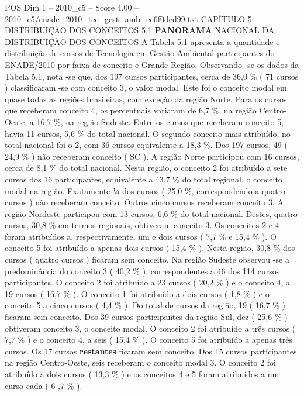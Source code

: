 \begin{textsample}{POS Dim 1 – 2010\_c5 – Score 4.00 – 2010\_c5/enade\_2010\_tec\_gest\_amb\_ee6f0ded99.txt}  \label{ex:f1_pos_138}
CAPÍTULO 5 DISTRIBUIÇÃO DOS CONCEITOS 5.1 \textbf{PANORAMA} NACIONAL DA DISTRIBUIÇÃO DOS CONCEITOS A Tabela 5.1 apresenta a quantidade e distribuição de cursos de Tecnologia em Gestão Ambiental participantes do ENADE/2010 por faixa de conceito e Grande Região.
Observando -se os dados da Tabela 5.1, nota -se que, dos 197 cursos participantes, cerca de 36,0 \% ( 71 cursos ) classificaram -se com conceito 3, o valor modal.
Este foi o conceito modal em quase todas as regiões brasileiras, com exceção da região Norte.
Para os cursos que receberam conceito 4, os percentuais variaram de 6,7 \%, na região Centro-Oeste, a 16,7 \%, na região Sudeste.
Entre os cursos que receberam conceito 5, havia 11 cursos, 5,6 \% do total nacional.
O segundo conceito mais atribuído, no total nacional foi o 2, com 36 cursos equivalente a 18,3 \%.
Dos 197 cursos, 49 ( 24,9 \% ) não receberam conceito ( SC ).
A região Norte participou com 16 cursos, cerca de 8,1 \% do total nacional.
Nesta região, o conceito 2 foi atribuído a sete cursos dos 16 participantes, equivalente a 43,7 \% do total regional, o conceito modal na região.
Exatamente ¼ dos cursos ( 25,0 \%, correspondendo a quatro cursos ) não receberam conceito.
Outros cinco cursos receberam conceito 3.
A região Nordeste participou com 13 cursos, 6,6 \% do total nacional.
Destes, quatro cursos, 30,8 \% em termos regionais, obtiveram conceito 3.
Os conceitos 2 e 4 foram atribuídos a, respectivamente, um e dois cursos ( 7,7 \% e 15,4 \% ).
O conceito 5 foi atribuído a apenas dois cursos ( 15,4 \% ).
Nesta região, 30,8 \% dos cursos ( quatro cursos ) ficaram sem conceito.
Na região Sudeste observou -se a predominância do conceito 3 ( 40,2 \% ), correspondentes a 46 dos 114 cursos participantes.
O conceito 2 foi atribuído a 23 cursos ( 20,2 \% ) e o conceito 4, a 19 cursos ( 16,7 \% ).
O conceito 1 foi atribuído a dois cursos ( 1,8 \% ) e o conceito 5 a cinco cursos ( 4,4 \% ).
Do total de cursos da região, 19 ( 16,7 \% ) ficaram sem conceito.
Dos 39 cursos participantes da região Sul, dez ( 25,6 \% ) obtiveram conceito 3, o conceito modal.
O conceito 2 foi atribuído a três cursos ( 7,7 \% ) e o conceito 4, a seis ( 15,4 \% ).
O conceito 5 foi atribuído a apenas três cursos.
Os 17 cursos \textbf{restantes} ficaram sem conceito.
Dos 15 cursos participantes na região Centro-Oeste, seis receberam o conceito modal 3.
O conceito 2 foi atribuído a dois cursos ( 13,3 \% ) e os conceitos 4 e 5 foram atribuídos a um curso cada ( 6-,7 \% ).

\end{textsample}
